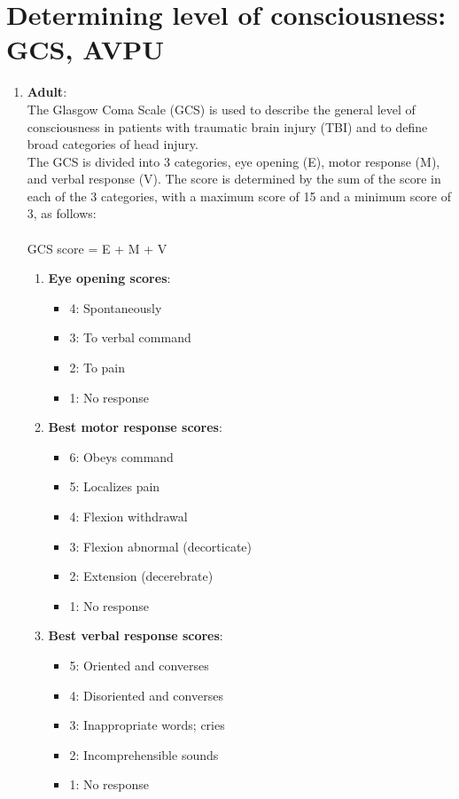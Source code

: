 \documentclass[11pt,a4paper]{report}
\begin{document}
\newpage
\section[Level of Consciousness]{Determining level of consciousness: GCS, AVPU}
\begin{enumerate}
	\item \textbf{Adult}: \\
	The Glasgow Coma Scale (GCS) is used to describe the general level of consciousness in patients with traumatic brain injury (TBI) and to define broad categories of head injury. \\
	The GCS is divided into 3 categories, eye opening (E), motor response (M), and verbal response (V). The score is determined by the sum of the score in each of the 3 categories, with a maximum score of 15 and a minimum score of 3, as follows: \\ \\
	GCS score = E + M + V
	\begin{enumerate}
		\item \textbf{Eye opening scores}:
		\begin{itemize}
			\item 4: Spontaneously
			\item 3: To verbal command
			\item 2: To pain
			\item 1: No response
		\end{itemize}
		\item \textbf{Best motor response scores}:
		\begin{itemize}
			\item 6: Obeys command
			\item 5: Localizes pain
			\item 4: Flexion withdrawal
			\item 3: Flexion abnormal (decorticate)
			\item 2: Extension (decerebrate)
			\item 1: No response
		\end{itemize}
		\item \textbf{Best verbal response scores}:
		\begin{itemize}
			\item 5: Oriented and converses
			\item 4: Disoriented and converses
			\item 3: Inappropriate words; cries
			\item 2: Incomprehensible sounds
			\item 1: No response

\end{itemize}
\end{enumerate}
\end{enumerate}
\end{document}
